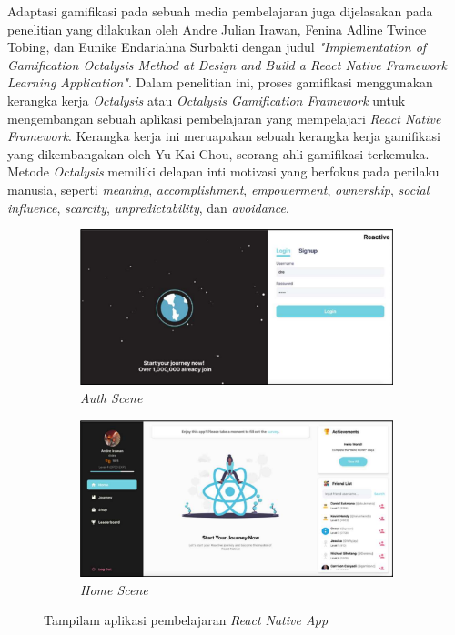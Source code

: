 Adaptasi gamifikasi pada sebuah media pembelajaran juga dijelasakan pada penelitian yang dilakukan oleh Andre Julian Irawan, Fenina Adline Twince Tobing, dan Eunike Endariahna Surbakti
dengan judul \textit{"Implementation of Gamification Octalysis Method at Design and Build a React Native Framework Learning Application"}\cite{OctalysisFrameworkAndre}.
Dalam penelitian ini, proses gamifikasi menggunakan kerangka kerja \textit{Octalysis} atau \textit{Octalysis Gamification Framework} untuk mengembangan sebuah aplikasi pembelajaran yang mempelajari \textit{React Native Framework}.
Kerangka kerja ini meruapakan sebuah kerangka kerja gamifikasi yang dikembangakan oleh Yu-Kai Chou, seorang ahli gamifikasi terkemuka\cite{marisa2020gamifikasi}.
Metode \textit{Octalysis} memiliki delapan inti motivasi yang berfokus pada perilaku manusia, seperti \textit{meaning}, \textit{accomplishment}, \textit{empowerment}, \textit{ownership}, \textit{social influence}, \textit{scarcity}, \textit{unpredictability}, dan \textit{avoidance}\cite{marisa2020gamifikasi}.

\begin{figure}[H]
	\centering
	\begin{subfigure}[b]{0.4\textwidth}
		\centering
	  \includegraphics[width=\linewidth]{contents/chapter-2/images/Andre-a1.png}
	  \caption{\textit{Auth Scene}}
	  \label{fig:sub-andre-a1}
	\end{subfigure}
	\begin{subfigure}[b]{0.4\textwidth}
	\centering
	  \includegraphics[width=\linewidth]{contents/chapter-2/images/Andre-a3.png}
	  \caption{\textit{Home Scene}}
	  \label{fig:sub-andre-a3}
	\end{subfigure}
	\caption{Tampilam aplikasi pembelajaran \textit{React Native App}\cite{OctalysisFrameworkAndre}}
	\label{fig:interface pembelajaran React Native}
\end{figure}


